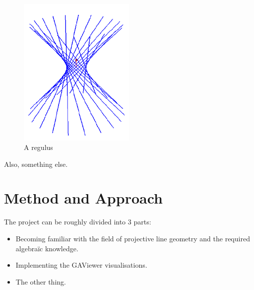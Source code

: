 \documentclass[a4paper, 10pt]{article}
\begin{document}
\begin{figure}[htbp]
  \centering
  \includegraphics[width=0.5\textwidth]{regulus.png}
  \caption{A regulus}
  \label{fig:regulus}
\end{figure}

Also, something else.


\section{Method and Approach}
The project can be roughly divided into 3 parts:
\begin{itemize}
  \item Becoming familiar with the field of projective line geometry and the
    required algebra\"{i}c knowledge.
  \item Implementing the GAViewer visualisations.
  \item The other thing.
\end{itemize}



\end{document}
